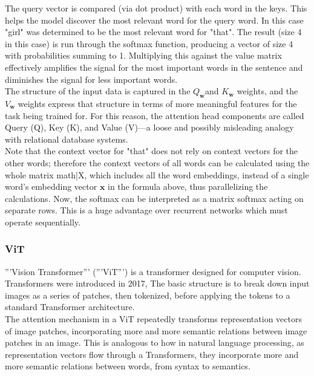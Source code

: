 The query vector is compared (via dot product) with each word in the keys. This helps the model discover the most relevant word for the query word. In this case "girl" was determined to be the most relevant word for "that". The result (size 4 in this case) is run through the softmax function, producing a vector of size 4 with probabilities summing to 1. Multiplying this against the value matrix effectively amplifies the signal for the most important words in the sentence and diminishes the signal for less important words.
\\

The structure of the input data is captured in the \(Q_\textbf{w}\)and \(K_\textbf{w}\) weights, and the  \(V_\textbf{w}\) weights express that structure in terms of more meaningful features for the task being trained for.  For this reason, the attention head components are called Query ({{Q}}), Key ({{K}}), and Value ({{V}})—a loose and possibly misleading analogy with relational database systems.
\\

Note that the context vector for "that" does not rely on context vectors for the other words; therefore the context vectors of all words can be calculated using the whole matrix {{math|X}}, which includes all the word embeddings, instead of a single word's embedding vector \(\textbf{x}\) in the formula above, thus parallelizing the calculations. Now, the softmax can be interpreted as a matrix softmax acting on separate rows.  This is a huge advantage over recurrent networks which must operate sequentially.
\\

\subsubsection{\textbf{ViT}}
\cite{ViT}
 '''Vision Transformer''' ('''ViT''') is a transformer designed for computer vision. Transformers were introduced in 2017, The basic structure is to break down input images as a series of patches, then tokenized, before applying the tokens to a standard Transformer architecture.
\\

 The attention mechanism in a ViT repeatedly transforms representation vectors of image patches, incorporating more and more semantic relations between image patches in an image. This is analogous to how in natural language processing, as representation vectors flow through a Transformers, they incorporate more and more semantic relations between words, from syntax to semantics.
\\

